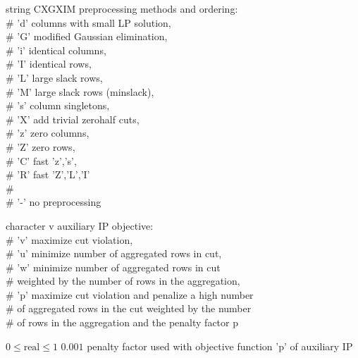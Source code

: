 %
{string}%
{CXGXIM}%
{preprocessing methods and ordering:\\   \#                      'd' columns with small LP solution,\\    \#                      'G' modified Gaussian elimination,\\     \#                      'i' identical columns,\\   \#                      'I' identical rows,\\   \#                      'L' large slack rows,\\   \#                      'M' large slack rows (minslack),\\   \#                      's' column singletons,\\   \#                      'X' add trivial zerohalf cuts,\\   \#                      'z' zero columns,\\   \#                      'Z' zero rows,\\   \#                      'C' fast {'z','s'},\\   \#                      'R' fast {'Z','L','I'}\\   \#                      \\                         \#                      '-' no preprocessing}%
{}

%
{character}%
{v}%
{auxiliary IP objective:\\   \#                      'v' maximize cut violation,\\   \#                      'u' minimize number of aggregated rows in cut,\\   \#                      'w' minimize number of aggregated rows in cut\\   \#                          weighted by the number of rows in the aggregation,\\   \#                      'p' maximize cut violation and penalize a high number\\   \#                          of aggregated rows in the cut weighted by the number\\   \#                          of rows in the aggregation and the penalty factor p}%
{}

%
{$0\leq\textrm{real}\leq1$}%
{$0.001$}%
{penalty factor used with objective function 'p' of auxiliary IP}%
{}

